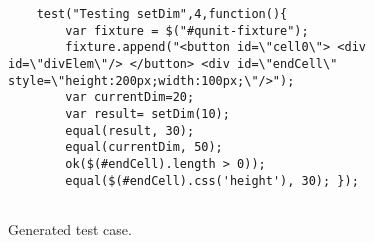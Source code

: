 \begin{figure}
\begin{lstlisting}
	test("Testing setDim",4,function(){
		var fixture = $("#qunit-fixture");
		fixture.append("<button id=\"cell0\"> <div id=\"divElem\"/> </button> <div id=\"endCell\" style=\"height:200px;width:100px;\"/>");
		var currentDim=20;
		var result= setDim(10);
		equal(result, 30);
		equal(currentDim, 50);
		ok($(#endCell).length > 0));
		equal($(#endCell).css('height'), 30); });
	
\end{lstlisting}
\vspace{-0.1in} 

\caption{Generated \qunit test case.}
\vspace{-0.2in}
\label{Fig:qunitTestSample}

\end{figure}